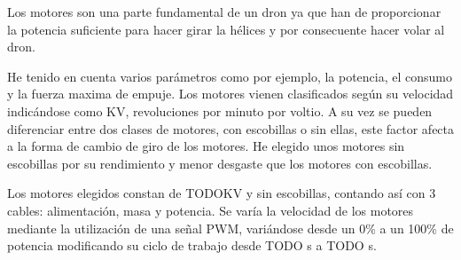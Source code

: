 
Los motores son una parte fundamental de un dron ya que han de proporcionar la potencia suficiente para hacer girar la hélices y por consecuente hacer volar al dron. 
                
                He tenido en cuenta varios parámetros como por ejemplo, la potencia, el consumo y la fuerza maxima de empuje. Los motores vienen clasificados según su velocidad indicándose como KV, revoluciones por minuto por voltio. A su vez se pueden diferenciar entre dos clases de motores, con escobillas o sin ellas, este factor afecta a la forma de cambio de giro de los motores. He elegido unos motores sin escobillas por su rendimiento y menor desgaste que los motores con escobillas. 
                
                Los motores elegidos constan de TODOKV y sin escobillas, contando así con 3 cables: alimentación, masa y potencia. Se varía la velocidad de los motores mediante la utilización de una señal PWM, variándose desde un 0\% a un 100\% de potencia modificando su ciclo de trabajo desde TODO s a TODO s.